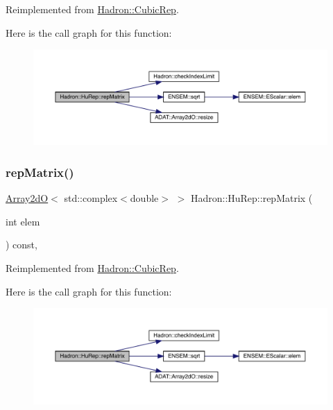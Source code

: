 Reimplemented from \mbox{\hyperlink{structHadron_1_1CubicRep_ac5d7e9e6f4ab1158b5fce3e4ad9e8005}{Hadron\+::\+Cubic\+Rep}}.

Here is the call graph for this function\+:
\nopagebreak
\begin{figure}[H]
\begin{center}
\leavevmode
\includegraphics[width=350pt]{d9/dd4/structHadron_1_1HuRep_a744a3604c724067d8912075d0d8acf59_cgraph}
\end{center}
\end{figure}
\mbox{\label{structHadron_1_1HuRep_a744a3604c724067d8912075d0d8acf59}} 
\subsubsection{\texorpdfstring{repMatrix()}{repMatrix()}\hspace{0.1cm}{\footnotesize\ttfamily [3/3]}}
{\footnotesize\ttfamily \mbox{\hyperlink{classADAT_1_1Array2dO}{Array2dO}}$<$ std\+::complex$<$double$>$ $>$ Hadron\+::\+Hu\+Rep\+::rep\+Matrix (\begin{DoxyParamCaption}\item[{int}]{elem }\end{DoxyParamCaption}) const\hspace{0.3cm}{\ttfamily [inline]}, {\ttfamily [virtual]}}



Reimplemented from \mbox{\hyperlink{structHadron_1_1CubicRep_ac5d7e9e6f4ab1158b5fce3e4ad9e8005}{Hadron\+::\+Cubic\+Rep}}.

Here is the call graph for this function\+:
\nopagebreak
\begin{figure}[H]
\begin{center}
\leavevmode
\includegraphics[width=350pt]{d9/dd4/structHadron_1_1HuRep_a744a3604c724067d8912075d0d8acf59_cgraph}
\end{center}
\end{figure}


